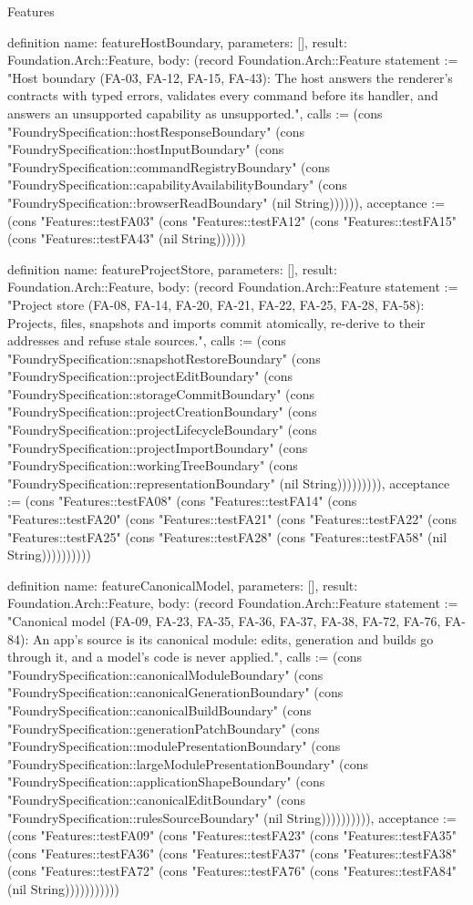 \begin{lexlean}{Features}
\begin{semanticmodule}
definition{
  name: featureHostBoundary,
  parameters: [],
  result: Foundation.Arch::Feature,
  body: (record Foundation.Arch::Feature {statement := "Host boundary (FA-03, FA-12, FA-15, FA-43): The host answers the renderer's contracts with typed errors, validates every command before its handler, and answers an unsupported capability as unsupported.", calls := (cons "FoundrySpecification::hostResponseBoundary" (cons "FoundrySpecification::hostInputBoundary" (cons "FoundrySpecification::commandRegistryBoundary" (cons "FoundrySpecification::capabilityAvailabilityBoundary" (cons "FoundrySpecification::browserReadBoundary" (nil String)))))), acceptance := (cons "Features::testFA03" (cons "Features::testFA12" (cons "Features::testFA15" (cons "Features::testFA43" (nil String)))))})
}

definition{
  name: featureProjectStore,
  parameters: [],
  result: Foundation.Arch::Feature,
  body: (record Foundation.Arch::Feature {statement := "Project store (FA-08, FA-14, FA-20, FA-21, FA-22, FA-25, FA-28, FA-58): Projects, files, snapshots and imports commit atomically, re-derive to their addresses and refuse stale sources.", calls := (cons "FoundrySpecification::snapshotRestoreBoundary" (cons "FoundrySpecification::projectEditBoundary" (cons "FoundrySpecification::storageCommitBoundary" (cons "FoundrySpecification::projectCreationBoundary" (cons "FoundrySpecification::projectLifecycleBoundary" (cons "FoundrySpecification::projectImportBoundary" (cons "FoundrySpecification::workingTreeBoundary" (cons "FoundrySpecification::representationBoundary" (nil String))))))))), acceptance := (cons "Features::testFA08" (cons "Features::testFA14" (cons "Features::testFA20" (cons "Features::testFA21" (cons "Features::testFA22" (cons "Features::testFA25" (cons "Features::testFA28" (cons "Features::testFA58" (nil String)))))))))})
}

definition{
  name: featureCanonicalModel,
  parameters: [],
  result: Foundation.Arch::Feature,
  body: (record Foundation.Arch::Feature {statement := "Canonical model (FA-09, FA-23, FA-35, FA-36, FA-37, FA-38, FA-72, FA-76, FA-84): An app's source is its canonical module: edits, generation and builds go through it, and a model's code is never applied.", calls := (cons "FoundrySpecification::canonicalModuleBoundary" (cons "FoundrySpecification::canonicalGenerationBoundary" (cons "FoundrySpecification::canonicalBuildBoundary" (cons "FoundrySpecification::generationPatchBoundary" (cons "FoundrySpecification::modulePresentationBoundary" (cons "FoundrySpecification::largeModulePresentationBoundary" (cons "FoundrySpecification::applicationShapeBoundary" (cons "FoundrySpecification::canonicalEditBoundary" (cons "FoundrySpecification::rulesSourceBoundary" (nil String)))))))))), acceptance := (cons "Features::testFA09" (cons "Features::testFA23" (cons "Features::testFA35" (cons "Features::testFA36" (cons "Features::testFA37" (cons "Features::testFA38" (cons "Features::testFA72" (cons "Features::testFA76" (cons "Features::testFA84" (nil String))))))))))})
}


\end{semanticmodule}
\end{lexlean}
